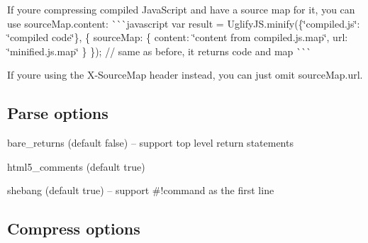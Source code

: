 If you\textquotesingle{}re compressing compiled Java\+Script and have a source map for it, you can use {\ttfamily source\+Map.\+content}\+: \`{}\`{}\`{}javascript var result = Uglify\+J\+S.\+minify(\{\char`\"{}compiled.\+js\char`\"{}\+: \char`\"{}compiled code\char`\"{}\}, \{ source\+Map\+: \{ content\+: \char`\"{}content from compiled.\+js.\+map\char`\"{}, url\+: \char`\"{}minified.\+js.\+map\char`\"{} \} \}); // same as before, it returns {\ttfamily code} and {\ttfamily map} \`{}\`{}\`{}

If you\textquotesingle{}re using the {\ttfamily X-\/\+Source\+Map} header instead, you can just omit {\ttfamily source\+Map.\+url}.

\subsection*{Parse options}


\begin{DoxyItemize}
\item {\ttfamily bare\+\_\+returns} (default {\ttfamily false}) -- support top level {\ttfamily return} statements
\item {\ttfamily html5\+\_\+comments} (default {\ttfamily true})
\item {\ttfamily shebang} (default {\ttfamily true}) -- support {\ttfamily \#!command} as the first line
\end{DoxyItemize}

\subsection*{Compress options}


